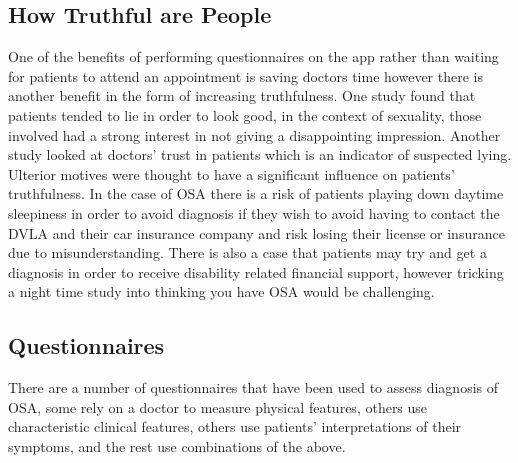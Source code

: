\subsection{How Truthful are People}
One of the benefits of performing questionnaires on the app rather than waiting for patients to attend an appointment is saving doctors time however there is another benefit in the form of increasing truthfulness. 
One study found that patients tended to lie in order to look good, in the context of sexuality, those involved had a strong interest in not giving a disappointing impression. 
Another study looked at doctors’ trust in patients which is an indicator of suspected lying. Ulterior motives were thought to have a significant influence on patients’ truthfulness. In the case of OSA there is a risk of patients playing down daytime sleepiness in order to avoid diagnosis if they wish to avoid having to contact the DVLA and their car insurance company and risk losing their license or insurance due to misunderstanding. There is also a case that patients may try and get a diagnosis in order to receive disability related financial support, however tricking a night time study into thinking you have OSA would be challenging. 

\subsection{Questionnaires}
There are a number of questionnaires that have been used to assess diagnosis of OSA, some rely on a doctor to measure physical features, others use characteristic clinical features, others use patients’ interpretations of their symptoms, and the rest use combinations of the above. 

